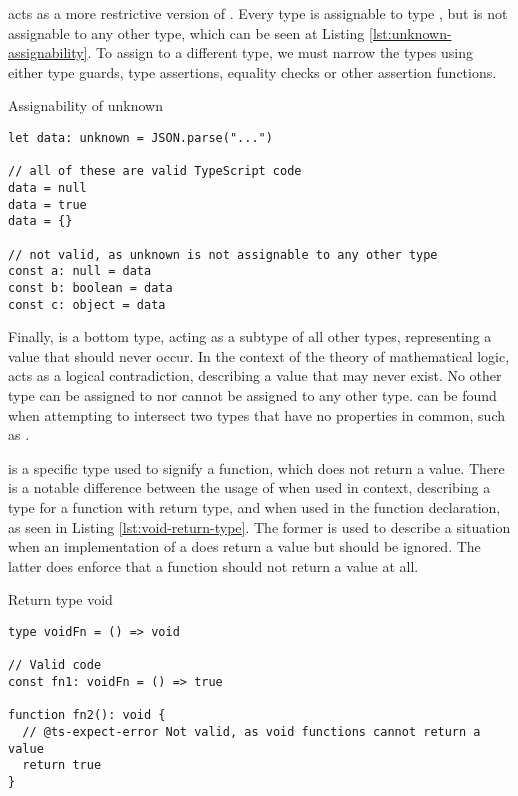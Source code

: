  acts as a more restrictive version of . Every type is assignable to type , but  is not assignable to any other type, which can be seen at Listing \ref{lst:unknown-assignability}. To assign  to a different type, we must narrow the types using either type guards, type assertions, equality checks or other assertion functions.

\begin{listing}[ht]
  \caption{Assignability of unknown}\label{lst:unknown-assignability}
  \begin{verbatim}
let data: unknown = JSON.parse("...") 

// all of these are valid TypeScript code
data = null
data = true
data = {}

// not valid, as unknown is not assignable to any other type
const a: null = data
const b: boolean = data
const c: object = data
  \end{verbatim}
\end{listing}

Finally,  is a bottom type, acting as a subtype of all other types, representing a value that should never occur. In the context of the theory of mathematical logic,  acts as a logical contradiction, describing a value that may never exist. No other type can be assigned to  nor  cannot be assigned to any other type.  can be found when attempting to intersect two types that have no properties in common, such as .

 is a specific type used to signify a function, which does not return a value. There is a notable difference between the usage of  when used in context, describing a type for a function with  return type, and when used in the function declaration, as seen in Listing \ref{lst:void-return-type}. The former is used to describe a situation when an implementation of a  does return a value but should be ignored. The latter does enforce that a function should not return a value at all.

\begin{listing}[ht]
  \caption{Return type void}\label{lst:void-return-type}
  \begin{verbatim}
type voidFn = () => void

// Valid code
const fn1: voidFn = () => true

function fn2(): void {
  // @ts-expect-error Not valid, as void functions cannot return a value
  return true
}
\end{verbatim}
\end{listing}

